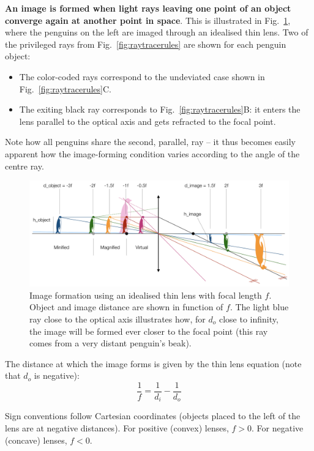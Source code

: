 \documentclass[a4paper]{report}
\begin{document}
	\textbf{An image is formed when light rays leaving one point of an object converge again at another point in space}.
	This is illustrated in Fig.~\ref{fig:imageforming}, where the penguins on the left are imaged through an idealised thin lens. 
	Two of the privileged rays from Fig.~\ref{fig:raytracerules} are shown for each penguin object:
	\begin{itemize}
	\item The color-coded rays correspond to the undeviated case shown in Fig.~\ref{fig:raytracerules}C. 
	\item The exiting black ray corresponds to Fig.~\ref{fig:raytracerules}B: it enters the lens parallel to the optical axis and gets refracted to the focal point.
	\end{itemize}
	Note how all penguins share the second, parallel, ray -- it thus becomes easily apparent how the image-forming condition varies according to the angle of the centre ray. 
	
	\begin{figure}[h]
		\center
		\includegraphics[width=1\textwidth]{figures/penguin_lens.png}
		\captionsetup{width=0.95\textwidth}
		\caption{Image formation using an idealised thin lens with focal length $f$. Object and image distance are shown in function of $f$. 
		The light blue ray close to the optical axis illustrates how, for $d_o$ close to infinity, the image will be formed ever closer to the focal point (this ray comes from a very distant penguin's beak).
		}
		\label{fig:imageforming}
	\end{figure}
	
	\noindent
	   The distance at which the image forms is given by the thin lens equation (note that $d_o$ is negative): 
	\begin{equation}
	\frac{1}{f} = \frac{1}{d_i} - \frac{1}{d_o}
	\label{eq:thinlens}
	\end{equation}
	
	Sign conventions follow Cartesian coordinates (objects placed to the left of the lens are at negative distances). For positive (convex) lenses, $f>0$. For negative (concave) lenses, $f<0$.
\end{document}
